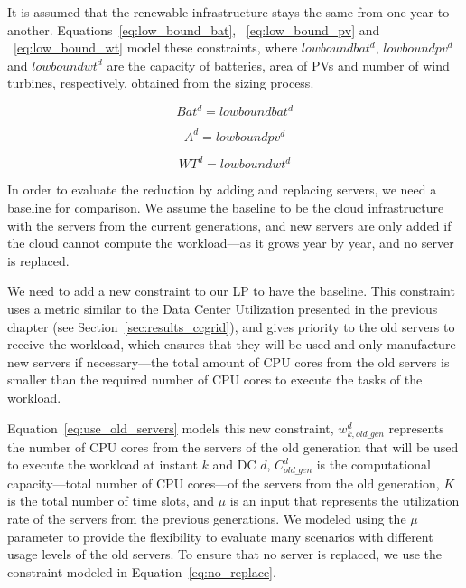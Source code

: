 It is assumed that the renewable infrastructure stays the same from one year to another. Equations~\eqref{eq:low_bound_bat},  ~\eqref{eq:low_bound_pv} and ~\eqref{eq:low_bound_wt} model these constraints, where $lowboundbat^d$, $lowboundpv^d$ and $lowboundwt^d$ are the capacity of batteries, area of PVs and number of wind turbines, respectively, obtained from the sizing process.

\begin{equation} \label{eq:low_bound_bat}
Bat^d = lowboundbat^d
\end{equation}

\begin{equation} \label{eq:low_bound_pv}
A^d = lowboundpv^d
\end{equation}

\begin{equation} \label{eq:low_bound_wt}
WT^d = lowboundwt^d
\end{equation}


In order to evaluate the  reduction by adding and replacing servers, we need a baseline for comparison. We assume the baseline to be the cloud infrastructure with the servers from the current generations, and new servers are only added if the cloud cannot compute the workload---as it grows year by year, and no server is replaced.

 We need to add a new constraint to our LP to have the baseline. This constraint uses a metric similar to the Data Center Utilization presented in the previous chapter (see Section~\ref{sec:results_ccgrid}), and gives priority to the old servers to receive the workload, which ensures that they will be used and only manufacture new servers if necessary---the total amount of CPU cores from the old servers is smaller than the required number of CPU cores to execute the tasks of the workload. 

 Equation~\eqref{eq:use_old_servers} models this new constraint, $w^d_{k,old\_gen}$ represents the number of CPU cores from the servers of the old generation that will be used to execute the workload at instant $k$ and DC $d$,  $C^d_{old\_gen}$ is the computational capacity---total number of CPU cores---of the servers from the old generation, $K$ is the total number of time slots, and $\mu$ is an input that represents the utilization rate of the servers from the previous generations. We modeled using the $\mu$ parameter to provide the flexibility to evaluate many scenarios with different usage levels of the old servers. To ensure that no server is replaced, we use the constraint modeled in Equation~\eqref{eq:no_replace}.

